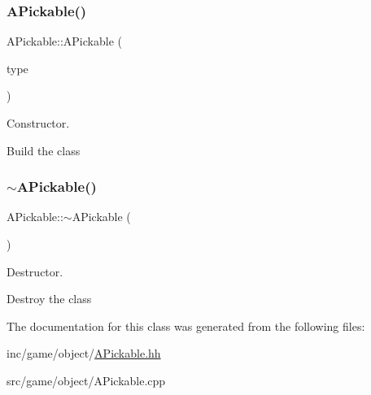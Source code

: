 \subsubsection{\texorpdfstring{A\+Pickable()}{APickable()}}
{\footnotesize\ttfamily A\+Pickable\+::\+A\+Pickable (\begin{DoxyParamCaption}\item[{indie\+::object\+Type}]{type }\end{DoxyParamCaption})}



Constructor. 

Build the class \mbox{\label{classAPickable_a145013963070158596ad2e0d07065f5d}} 
\subsubsection{\texorpdfstring{$\sim$\+A\+Pickable()}{~APickable()}}
{\footnotesize\ttfamily A\+Pickable\+::$\sim$\+A\+Pickable (\begin{DoxyParamCaption}{ }\end{DoxyParamCaption})}



Destructor. 

Destroy the class 

The documentation for this class was generated from the following files\+:\begin{DoxyCompactItemize}
\item 
inc/game/object/\hyperlink{APickable_8hh}{A\+Pickable.\+hh}\item 
src/game/object/A\+Pickable.\+cpp\end{DoxyCompactItemize}
